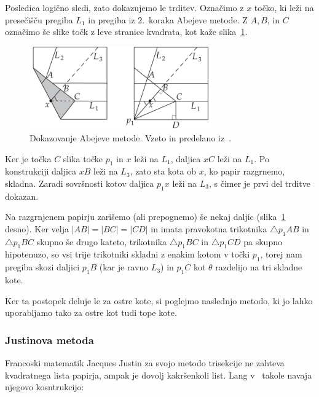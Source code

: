 \begin{dokaz}
    Posledica logično sledi, zato dokazujemo le trditev. Označimo z $x$ točko, ki leži na presečišču pregiba $L_1$ in pregiba iz $2$.\ koraka Abejeve metode. Z $A, B$, in $C$ označimo še slike točk z leve stranice kvadrata, kot kaže slika~\ref{fig:abe_2}.
    \begin{figure}[h]
        \centering
        \includegraphics[width=0.7\textwidth]{images/starogr_problemi/abe_trisekcija.png}
        \caption[Abejeva metoda ($2$.\ del)]{Dokazovanje Abejeve metode. Vzeto in predelano iz~\cite[str.\ 65]{hull2013}.}
        \label{fig:abe_2}
    \end{figure}
    Ker je točka $C$ slika točke $p_1$ in $x$ leži na $L_1$, daljica $xC$ leži na $L_1$. Po konstrukciji daljica $xB$ leži na $L_3$, zato sta kota ob $x$, ko papir razgrnemo, skladna. Zaradi sovršnosti kotov daljica $p_1x$ leži na $L_3$, s čimer je prvi del trditve dokazan.
    
    Na razgrnjenem papirju zarišemo (ali prepognemo) še nekaj daljic (slika~\ref{fig:abe_2} desno). Ker velja $|AB| = |BC| = |CD|$ in imata pravokotna trikotnika $\triangle p_1AB$ in $\triangle p_1BC$ skupno še drugo kateto, trikotnika $\triangle p_1BC$ in $\triangle p_1CD$ pa skupno hipotenuzo, so vsi trije trikotniki skladni z enakim kotom v točki $p_1$, torej nam pregiba skozi daljici $p_1B$ (kar je ravno $L_3$) in $p_1C$ kot $\theta$ razdelijo na tri skladne kote.
\end{dokaz}

Ker ta postopek deluje le za ostre kote, si poglejmo naslednjo metodo, ki jo lahko uporabljamo tako za ostre kot tudi tope kote.

\subsubsection*{Justinova metoda}

Francoski matematik Jacques Justin za svojo metodo trisekcije ne zahteva kvadratnega lista papirja, ampak je dovolj kakršenkoli list. Lang v~\cite[str.\ 34]{lang2013} takole navaja njegovo kosntrukcijo:

